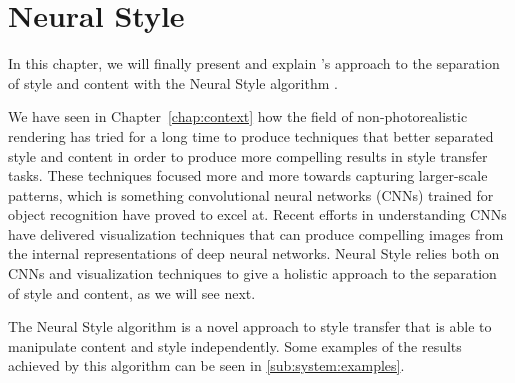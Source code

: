 
\chapter{Neural Style}
\label{chap:system}




In this chapter, we will finally present and explain \citeauthor{Gatys2015B}'s approach to the separation of style and content with the Neural Style algorithm \cite{Gatys2015B}.

We have seen in Chapter~\ref{chap:context} how the field of non-photorealistic rendering has tried for a long time to produce techniques that better separated style and content in order to produce more compelling results in style transfer tasks.
These techniques focused more and more towards capturing larger-scale patterns, which is something convolutional neural networks (CNNs) trained for object recognition have proved to excel at.
Recent efforts in understanding CNNs have delivered visualization techniques that can produce compelling images from the internal representations of deep neural networks.
Neural Style relies both on CNNs and visualization techniques to give a holistic approach to the separation of style and content, as we will see next.

The Neural Style algorithm is a novel approach to style transfer that is able to manipulate content and style independently.
Some examples of the results achieved by this algorithm can be seen in \autoref{sub:system:examples}.


